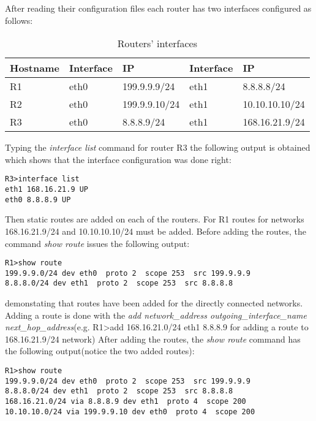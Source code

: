 {{After reading their configuration files each router has two interfaces configured as follows:
\begin{center}
  \begin{table}[htb]
  \begin{center}
  \begin{tabular}{| l | l | l | l | l |}
    \hline
      Hostname & Interface & IP & Interface & IP \\ \hline
      R1 & eth0 & 199.9.9.9/24 & eth1 & 8.8.8.8/24 \\ \hline
      R2 & eth0 & 199.9.9.10/24 & eth1 & 10.10.10.10/24\\ \hline
      R3 & eth0 & 8.8.8.9/24 & eth1 & 168.16.21.9/24 \\
    \hline
  \end{tabular}
  \end{center}
  \caption{Routers' interfaces}
  \label{table:tdevices}
  \end{table}
\end{center}
Typing the \textit{interface list} command for router R3 the following output is obtained which shows that the interface configuration was done right:
\lstset{language=TeX, caption=Router R3 interfaces}
\begin{lstlisting}
R3>interface list  
eth1 168.16.21.9 UP
eth0 8.8.8.9 UP
\end{lstlisting}

Then static routes are added on each of the routers.
For R1 routes for networks 168.16.21.9/24 and 10.10.10.10/24 must be added.
Before adding the routes, the command \textit{show route} issues the following output:
\lstset{language=TeX, caption=Directly connected routes}
\begin{lstlisting}
R1>show route  
199.9.9.0/24 dev eth0  proto 2  scope 253  src 199.9.9.9 
8.8.8.0/24 dev eth1  proto 2  scope 253  src 8.8.8.8 
\end{lstlisting}
demonstating that routes have been added for the directly connected networks.
Adding a route is done with the \textit{add network_address outgoing_interface_name next_hop_address}(e.g. R1>add 168.16.21.0/24 eth1 8.8.8.9 for adding a route to 168.16.21.9/24 network)
After adding the routes, the \textit{show route} command has the following output(notice the two added routes):
\lstset{language=TeX, caption=R1 routing table}
\begin{lstlisting}
R1>show route  
199.9.9.0/24 dev eth0  proto 2  scope 253  src 199.9.9.9 
8.8.8.0/24 dev eth1  proto 2  scope 253  src 8.8.8.8 
168.16.21.0/24 via 8.8.8.9 dev eth1  proto 4  scope 200
10.10.10.0/24 via 199.9.9.10 dev eth0  proto 4  scope 200
\end{lstlisting}

}}
